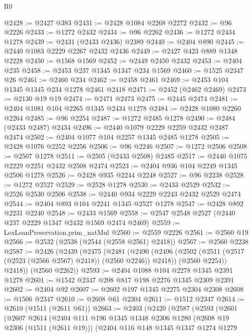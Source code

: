 \begin{lexlean}{R0}
\begin{coremodule}
@2428 := @2427 @383
@2431 := @2428 @1084 @2268 @2272
@2432 := @96 @2226
@2433 := @1272 @2432
@2434 := @96 @2262
@2436 := @1272 @2434 @1278
@2439 := @2431 (@2433 @2436) @2389
@2440 := @2404 @890
@2445 := @2440 @1083 @2229 @2267 @2432 @2436
@2449 := @2427 @423 @889 @1348 @2228
@2450 := @1568 @1569
@2452 := @2449 @2450 @2432
@2453 := @2404 @235
@2458 := @2453 @237 @1345 @1347 @234 @1569
@2460 := @1525 @2347 @26
@2461 := @2460 @234
@2462 := @2458 @2461
@2469 := @2453 @104 @1345 @1345 @234 @1278 @2461 @2418
@2471 := @2452 (@2462 @2469)
@2473 := @2130 @19 @19
@2474 := @2471 @2473
@2475 := @2445 @2474
@2481 := @2404 @1081 @104 @2265 @1345 @2434 @1278
@2484 := @2428 @1080 @2260 @2264
@2485 := @96 @2254
@2487 := @1272 @2485 @1278
@2490 := @2484 (@2433 @2487) @2434
@2496 := @2440 @1079 @2229 @2259 @2432 @2487 @2474
@2502 := @2404 @1077 @104 @2257 @1345 @2485 @1278
@2505 := @2428 @1076 @2252 @2256
@2506 := @96 @2246
@2507 := @1272 @2506
@2508 := @2507 @1278
@2511 := @2505 (@2433 @2508) @2485
@2517 := @2440 @1075 @2229 @2251 @2432 @2508 @2474
@2523 := @2404 @936 @104 @2249 @1345 @2506 @1278
@2526 := @2428 @935 @2244 @2248
@2527 := @96 @2238
@2528 := @1272 @2527
@2529 := @2528 @1278
@2530 := @2433 @2529
@2532 := @2526 @2530 @2506
@2538 := @2440 @934 @2229 @2243 @2432 @2529 @2474
@2544 := @2404 @893 @104 @2241 @1345 @2527 @1278
@2547 := @2428 @892 @2231 @2240
@2548 := @2433 @1569
@2558 := @2547 @2548 @2527 (@2440 @237 @2229 @1347 @2432 @1569 @2474 @2469)
@2559 := LexLeanPreservation.prim_natMul
@2560 := @2559 @2226
@2561 := @2560 @19
@2566 := @2532 (@2538 (@2544 (@2558 @2561) @2418))
@2567 := @2560 @2238
@2587 := @2426
    (@2439
      (@2475
        (@2481
          (@2490
            (@2496 (@2502 (@2511 (@2517 (@2523 (@2566 @2567) @2418)) (@2560 @2246)) @2418))
            (@2560 @2254))
          @2418))
      (@2560 @2262))
@2593 := @2404 @1088 @104 @2278 @1345 @2391 @1278
@2601 := @1542 @2347 @208 @817 @198 @2276 @1345 @2309 @2391
@2602 := @2404 @92
@2607 := @2602 @197 @1345 @2275 @2304 @2308
@2608 := @1506 @2347
@2610 := @2608 @61 @2304
@2611 := @1512 @2347
@2614 := @2610 (@1511 (@2611 @61))
@2663 := @2403
    (@2420
      (@2587
        (@2593
          (@2601
            (@2607
              @2614
              (@2404
                @111
                @196
                @1345
                @1348
                @2306
                @1280
                (@2608 @19 @2306 (@1511 (@2611 @19)))
                (@2404
                  @116
                  @148
                  @1345
                  @1347
                  @1274
                  @1279

\end{coremodule}
\end{lexlean}
